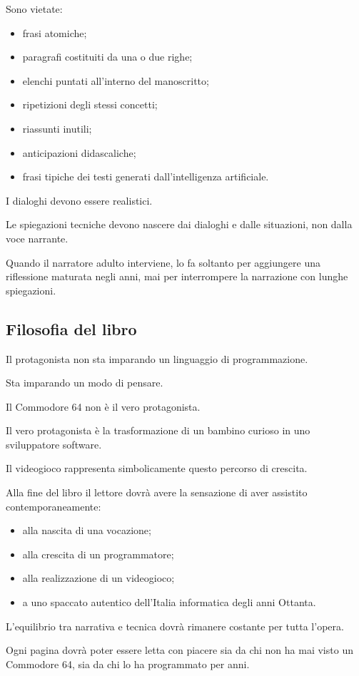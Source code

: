 \documentclass{article}
\begin{document}
Sono vietate:

\begin{itemize}
\item frasi atomiche; 
\item paragrafi costituiti da una o due righe; 
\item elenchi puntati all'interno del manoscritto; 
\item ripetizioni degli stessi concetti; 
\item riassunti inutili; 
\item anticipazioni didascaliche; 
\item frasi tipiche dei testi generati dall'intelligenza artificiale. 
\end{itemize}
I dialoghi devono essere realistici.

Le spiegazioni tecniche devono nascere dai dialoghi e dalle situazioni, non dalla voce narrante.

Quando il narratore adulto interviene, lo fa soltanto per aggiungere una riflessione maturata negli anni, mai per
interrompere la narrazione con lunghe spiegazioni.

\subsection{Filosofia del libro}
Il protagonista non sta imparando un linguaggio di programmazione.

Sta imparando un modo di pensare.

Il Commodore 64 non è il vero protagonista.

Il vero protagonista è la trasformazione di un bambino curioso in uno sviluppatore software.

Il videogioco rappresenta simbolicamente questo percorso di crescita.

Alla fine del libro il lettore dovrà avere la sensazione di aver assistito contemporaneamente:

\begin{itemize}
\item alla nascita di una vocazione; 
\item alla crescita di un programmatore; 
\item alla realizzazione di un videogioco; 
\item a uno spaccato autentico dell'Italia informatica degli anni Ottanta. 
\end{itemize}
L'equilibrio tra narrativa e tecnica dovrà rimanere costante per tutta l'opera.

Ogni pagina dovrà poter essere letta con piacere sia da chi non ha mai visto un Commodore 64, sia da chi lo ha
programmato per anni.


\bigskip
\end{document}
